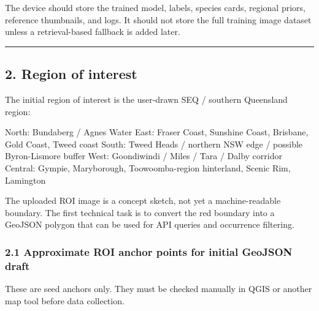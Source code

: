 \documentclass[
  11pt,
]{article}
\newenvironment{Shaded}{}{}
\newcommand{\NormalTok}[1]{#1}
\begin{document}
The device should store the trained model, labels, species cards,
regional priors, reference thumbnails, and logs. It should not store the
full training image dataset unless a retrieval-based fallback is added
later.

\begin{center}\rule{0.5\linewidth}{0.5pt}\end{center}

\subsection{2. Region of interest}\label{region-of-interest}

The initial region of interest is the user-drawn SEQ / southern
Queensland region:

\begin{Shaded}
\begin{Highlighting}[]
\NormalTok{North: Bundaberg / Agnes Water}
\NormalTok{East: Fraser Coast, Sunshine Coast, Brisbane, Gold Coast, Tweed coast}
\NormalTok{South: Tweed Heads / northern NSW edge / possible Byron{-}Lismore buffer}
\NormalTok{West: Goondiwindi / Miles / Tara / Dalby corridor}
\NormalTok{Central: Gympie, Maryborough, Toowoomba{-}region hinterland, Scenic Rim, Lamington}
\end{Highlighting}
\end{Shaded}

The uploaded ROI image is a concept sketch, not yet a machine-readable
boundary. The first technical task is to convert the red boundary into a
GeoJSON polygon that can be used for API queries and occurrence
filtering.

\subsubsection{2.1 Approximate ROI anchor points for initial GeoJSON
draft}\label{approximate-roi-anchor-points-for-initial-geojson-draft}

These are seed anchors only. They must be checked manually in QGIS or
another map tool before data collection.
\end{document}
